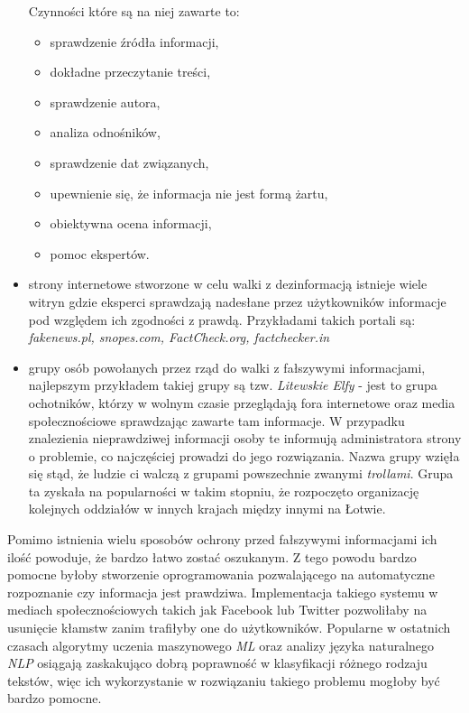 \begin{itemize}
    Czynności które są na niej zawarte to: 
    \begin{itemize}
        \item sprawdzenie źródła informacji,
        \item dokładne przeczytanie treści,
        \item sprawdzenie autora,
        \item analiza odnośników,
        \item sprawdzenie dat związanych,
        \item upewnienie się, że informacja nie jest formą żartu,
        \item obiektywna ocena informacji,
        \item pomoc ekspertów.
    \end{itemize}
    \item strony internetowe stworzone w celu walki z dezinformacją istnieje
    wiele witryn gdzie eksperci sprawdzają nadesłane przez użytkowników informacje
    pod względem ich zgodności z prawdą.
    Przykładami takich portali są: \emph{fakenews.pl, snopes.com, FactCheck.org, factchecker.in} 
    \item grupy osób powołanych przez rząd do walki z fałszywymi informacjami, najlepszym przykładem
    takiej grupy są tzw. \emph{Litewskie Elfy} - jest to grupa ochotników, którzy w wolnym czasie przeglądają 
    fora internetowe oraz media społecznościowe sprawdzając zawarte tam informacje. W przypadku
    znalezienia nieprawdziwej informacji osoby te informują administratora strony o problemie, co najczęściej
    prowadzi do jego rozwiązania. Nazwa grupy wzięła się stąd, że ludzie ci walczą z 
    grupami powszechnie zwanymi \emph{trollami}. Grupa ta zyskała na popularności
    w takim stopniu, że rozpoczęto organizację kolejnych oddziałów w innych krajach
    między innymi na Łotwie.~\cite{Elves}
\end{itemize}
Pomimo istnienia wielu sposobów ochrony przed fałszywymi informacjami ich ilość powoduje,
że bardzo łatwo zostać oszukanym. Z tego powodu bardzo pomocne byłoby stworzenie oprogramowania
pozwalającego na automatyczne rozpoznanie czy informacja jest prawdziwa.
Implementacja takiego systemu w mediach społecznościowych takich jak Facebook lub Twitter pozwoliłaby na usunięcie 
kłamstw zanim trafiłyby one do użytkowników. Popularne w ostatnich czasach algorytmy uczenia
maszynowego \emph{ML} oraz analizy języka naturalnego \emph{NLP} osiągają zaskakująco dobrą 
poprawność w klasyfikacji różnego rodzaju tekstów, więc ich wykorzystanie w rozwiązaniu takiego 
problemu mogłoby być bardzo pomocne.

